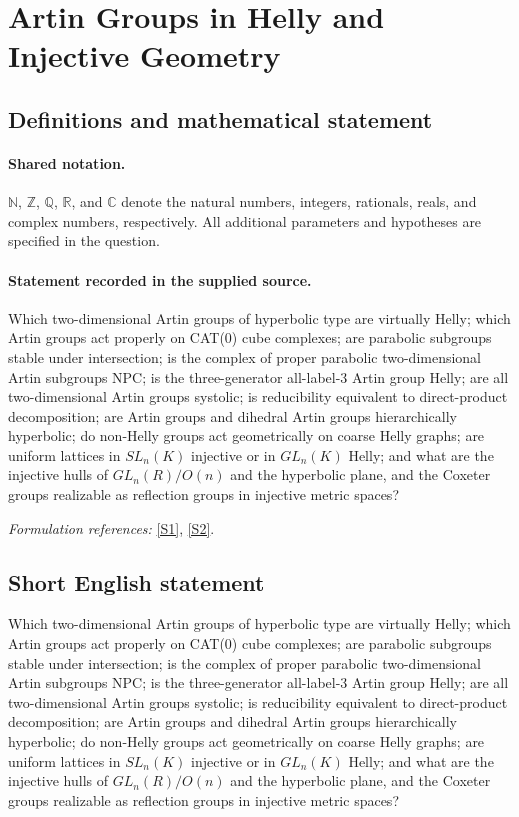 \documentclass[11pt]{article}
\newcommand{\sref}[2]{\hyperlink{source:#1:#2}{[S#2]}}
\begin{document}
\section{Artin Groups in Helly and Injective Geometry}\label{statement}

\subsection{Definitions and mathematical statement}

\paragraph{Shared notation.}$\mathbb N$, $\mathbb Z$, $\mathbb Q$, $\mathbb R$, and $\mathbb C$ denote the natural numbers, integers, rationals, reals, and complex numbers, respectively. All additional parameters and hypotheses are specified in the question.


\paragraph{Statement recorded in the supplied source.}
Which two-dimensional Artin groups of hyperbolic type are virtually Helly; which Artin groups act properly on CAT(0) cube complexes; are parabolic subgroups stable under intersection; is the complex of proper parabolic two-dimensional Artin subgroups NPC; is the three-generator all-label-3 Artin group Helly; are all two-dimensional Artin groups systolic; is reducibility equivalent to direct-product decomposition; are Artin groups and dihedral Artin groups hierarchically hyperbolic; do non-Helly groups act geometrically on coarse Helly graphs; are uniform lattices in $SL_n(K)$ injective or in $GL_n(K)$ Helly; and what are the injective hulls of $GL_n(R)/O(n)$ and the hyperbolic plane, and the Coxeter groups realizable as reflection groups in injective metric spaces?
\par\smallskip\textit{Formulation references:} \sref{statement}{1}, \sref{statement}{2}.
\subsection{Short English statement}
Which two-dimensional Artin groups of hyperbolic type are virtually Helly; which Artin groups act properly on CAT(0) cube complexes; are parabolic subgroups stable under intersection; is the complex of proper parabolic two-dimensional Artin subgroups NPC; is the three-generator all-label-3 Artin group Helly; are all two-dimensional Artin groups systolic; is reducibility equivalent to direct-product decomposition; are Artin groups and dihedral Artin groups hierarchically hyperbolic; do non-Helly groups act geometrically on coarse Helly graphs; are uniform lattices in $SL_n(K)$ injective or in $GL_n(K)$ Helly; and what are the injective hulls of $GL_n(R)/O(n)$ and the hyperbolic plane, and the Coxeter groups realizable as reflection groups in injective metric spaces?
\end{document}
